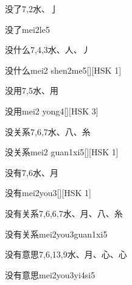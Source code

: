 \begin{entry}{没了}{7,2}{⽔、⼅}
  \begin{phonetics}{没了}{mei2le5}
  \end{phonetics}
\end{entry}

\begin{entry}{没什么}{7,4,3}{⽔、⼈、⼃}
  \begin{phonetics}{没什么}{mei2 shen2me5}[][HSK 1]
  \end{phonetics}
\end{entry}

\begin{entry}{没用}{7,5}{⽔、⽤}
  \begin{phonetics}{没用}{mei2 yong4}[][HSK 3]
  \end{phonetics}
\end{entry}

\begin{entry}{没关系}{7,6,7}{⽔、⼋、⽷}
  \begin{phonetics}{没关系}{mei2 guan1xi5}[][HSK 1]
  \end{phonetics}
\end{entry}

\begin{entry}{没有}{7,6}{⽔、⽉}
  \begin{phonetics}{没有}{mei2you3}[][HSK 1]
  \end{phonetics}
\end{entry}

\begin{entry}{没有关系}{7,6,6,7}{⽔、⽉、⼋、⽷}
  \begin{phonetics}{没有关系}{mei2you3guan1xi5}
  \end{phonetics}
\end{entry}

\begin{entry}{没有意思}{7,6,13,9}{⽔、⽉、⼼、⼼}
  \begin{phonetics}{没有意思}{mei2you3yi4si5}
  \end{phonetics}
\end{entry}

